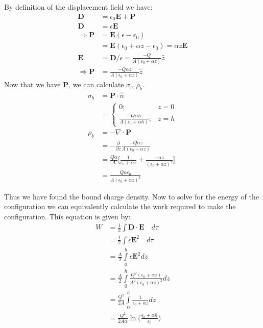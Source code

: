 \documentclass[a4paper, 11pt]{article}
\begin{document}
\noindent By definition of the displacement field we have: 
	\begin{align*}
		\mathbf{D} &= \epsilon_0 \mathbf{E} + \mathbf{P} \\ 
		\mathbf{D} &= \epsilon \mathbf{E} \\ 
		\Rightarrow \mathbf{P} &= \mathbf{E}(\epsilon - \epsilon_0) \\ 
		&= \mathbf{E}(\epsilon_0 + \alpha z - \epsilon_0) = \alpha z \mathbf{E} \\
		\mathbf{E} &= \mathbf{D}/\epsilon = \frac{-Q}{A(\epsilon_0 + \alpha z)}\hat{z} \\
		\Rightarrow \mathbf{P} &= \frac{-Q\alpha z}{A(\epsilon_0 + \alpha z)}\hat{z}
	\end{align*}
Now that we have \textbf{P}, we can calculate $\sigma_b, \rho_b$. 
	\begin{align*}
		\sigma_b &= \mathbf{P} \cdot \hat{n} \\ 
		&= \begin{cases}
			0; & z=0 \\ 
			\frac{-Q\alpha h}{A(\epsilon_0 + \alpha h)}; & z = h
		\end{cases}\\
		\rho_b &= -\nabla \cdot \mathbf{P} \\
		&= -\frac{\partial}{\partial z}\frac{-Q\alpha z}{A(\epsilon_0 + \alpha z)} \\ 
		&= \frac{Q\alpha}{A}\Bigg[ \frac{1}{\epsilon_0 + \alpha z} + \frac{-\alpha z}{(\epsilon_0 + \alpha z)^2} \Bigg] \\ 
		&= \frac{Q\alpha \epsilon_0}{A(\epsilon_0 + \alpha z)^2}
	\end{align*}

Thus we have found the bound charge density. Now to solve for the energy of the configuration we can equivalently calculate the work required to make the configuration. This equation is given by: 
	\begin{align*}
		W &= \frac{1}{2} \int \mathbf{D} \cdot \mathbf{E} \quad d\tau \\ 
		&= \frac{1}{2} \int \epsilon \mathbf{E}^2 \quad d\tau \\ 
		&= \frac{A}{2} \int\limits_0^h \epsilon \mathbf{E}^2 dz \\ 
		&= \frac{A}{2} \int\limits_0^h \frac{Q^2(\epsilon_0+\alpha z)}{A^2(\epsilon_0 + \alpha z)^2} dz \\
		&= \frac{Q^2}{2A}\int\limits_0^h \frac{1}{\epsilon_0 + \alpha z} dz \\
		&= \frac{Q^2}{2A\alpha}\ln\Big(\frac{\epsilon_0 + \alpha h}{\epsilon_0}\Big)
	\end{align*}
\end{document}
